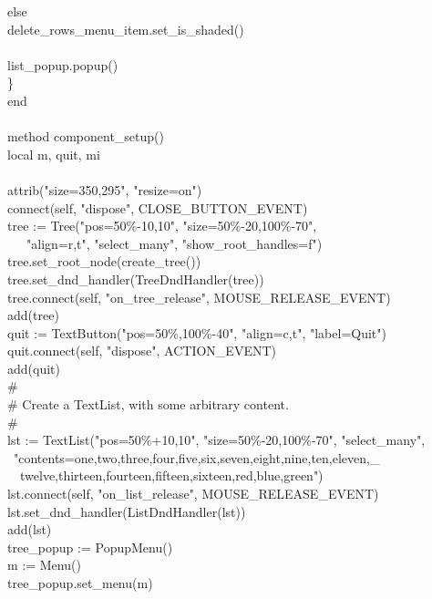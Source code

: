{\>\>\>else \\
\>\>\>\>delete\_rows\_menu\_item.set\_is\_shaded() \\
\ \\
\>\>\>list\_popup.popup() \\
\>\>\>\} \\
\>end \\
\ \\
\>method component\_setup() \\
\>\>local m, quit, mi \\
\\
\>\>attrib("size=350,295", "resize=on") \\
\>\>connect(self, "dispose", CLOSE\_BUTTON\_EVENT) \\
\>\>tree := Tree("pos=50\%-10,10", "size=50\%-20,100\%-70", \\
\>\>\>\>\>\ \ \ "align=r,t", "select\_many", "show\_root\_handles=f") \\
\>\>tree.set\_root\_node(create\_tree()) \\
\>\>tree.set\_dnd\_handler(TreeDndHandler(tree)) \\
\>\>tree.connect(self, "on\_tree\_release", MOUSE\_RELEASE\_EVENT) \\
\>\>add(tree) \\
\>\>quit := TextButton("pos=50\%,100\%-40", "align=c,t", "label=Quit") \\
\>\>quit.connect(self, "dispose", ACTION\_EVENT) \\
\>\>add(quit) \\
\>\>\# \\
\>\>\# Create a TextList, with some arbitrary content. \\
\>\>\# \\
\>\>lst := TextList("pos=50\%+10,10", "size=50\%-20,100\%-70", "select\_many", \\
\>\>\>\>\>\>\ "contents=one,two,three,four,five,six,seven,eight,nine,ten,eleven,\_ \\
\>\>\>\>\>\>\ \ twelve,thirteen,fourteen,fifteen,sixteen,red,blue,green") \\
\>\>lst.connect(self, "on\_list\_release", MOUSE\_RELEASE\_EVENT) \\
\>\>lst.set\_dnd\_handler(ListDndHandler(lst)) \\
\>\>add(lst) \\
\>\>tree\_popup := PopupMenu() \\
\>\>m := Menu() \\
\>\>tree\_popup.set\_menu(m) \\
}
